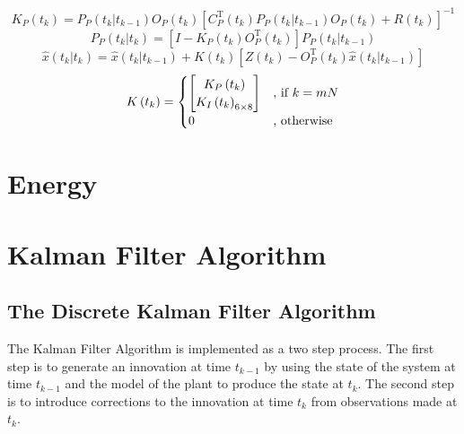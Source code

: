 \documentclass[a4paper]{report}
\numberwithin{equation}{chapter}
\begin{document}
\begin{equation}
K_P \left( t_k \right) = P_P \left( t_k | t_{k - 1} \right) O_P \left( t_k \right) \left[ C^{\mathrm{T}}_P \left( t_k \right) P_P \left( t_k | t_{k - 1} \right) O_P \left( t_k \right) + R \left( t_k \right) \right]^{-1}
\end{equation}
\begin{equation}
P_P \left( t_k | t_k \right) = \left[ I - K_P \left( t_k \right) O_P^{\mathrm{T}} \left( t_k \right) \right] P_P \left( t_k | t_{k - 1} \right)
\end{equation}
\begin{equation}
\hat{x} \left( t_k | t_k \right) = \hat{x} \left( t_k | t_{k - 1} \right) + K \left( t_k \right) \left[ Z \left( t_k \right) - O_P^{\mathrm{T}} \left( t_k \right) \hat{x} \left( t_k | t_{k - 1} \right) \right]
\end{equation}
\begin{equation}
K \left( t_k \right) = 
\begin{cases}
\begin{bmatrix}
K_P \left( t_k \right)\\
K_I \left( t_k \right)_{6 \times 8}\\
\end{bmatrix}
& \text{, if $ k = mN$} \\
0 & \text{, otherwise}
\end{cases}
\end{equation}

\clearpage\setcounter{page}{1}
\chapter[Energy]{Energy}

\appendix

\clearpage\setcounter{page}{1}
\chapter[Kalman Filter Algorithm]{Kalman Filter Algorithm}

\section[The Discrete Kalman Filter Algorithm]{The Discrete Kalman Filter Algorithm}

The Kalman Filter Algorithm is implemented as a two step process. The first step is to generate an innovation at time $t_{k-1}$ by using the state of the system at time $t_{k - 1}$ and the model of the plant to produce the state at $t_k$. The second step is to introduce corrections to the innovation at time $t_k$ from observations made at $t_k$.
\end{document}
